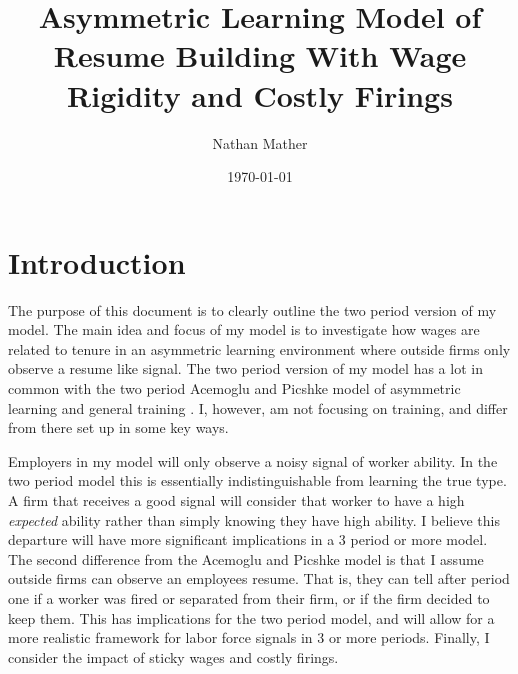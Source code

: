 \documentclass[11pt]{article}
\title{Asymmetric Learning Model of Resume Building With Wage Rigidity and Costly Firings} %
\author{Nathan Mather} %
\date{\today} %
\begin{document}
	
	
	\maketitle %
	
	\setcounter{tocdepth}{3} %
	
	\tableofcontents %
	

	\section{Introduction}
	The purpose of this document is to clearly outline the two period version of my model. The main idea and focus of my model is to investigate how wages are related to tenure in an asymmetric learning environment where outside firms only observe a resume like signal. The two period version of my model has a lot in common with the two period Acemoglu and Picshke model of asymmetric learning and general training \cite{AP_1998}. I, however, am not focusing on training, and differ from there set up in some key ways. \par
	
	Employers in my model will only observe a noisy signal of worker ability. In the two period model this is essentially indistinguishable from learning the true type. A firm that receives a good signal will consider that worker to have a high \textit{expected} ability rather than simply knowing they have high ability. I believe this departure will have more significant implications in a 3 period or more model. The second difference from the Acemoglu and Picshke model is that I assume outside firms can observe an employees resume. That is,  they can tell after period one if a worker was fired or separated from their firm, or if the firm decided to keep them. This has implications for the two period model, and will allow for a more realistic framework for labor force signals in 3 or more periods. Finally, I consider the impact of sticky wages and costly firings.  \par 
\end{document}

